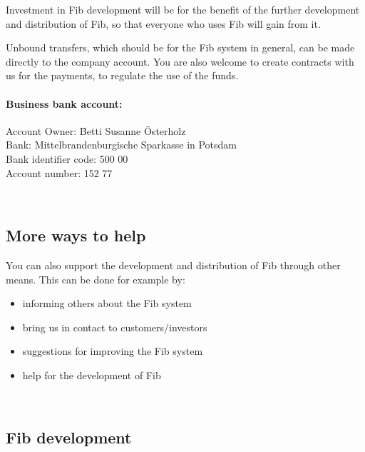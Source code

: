 \documentclass[12pt,a4paper]{article}
\begin{document}
Investment in Fib development will be for the benefit of the further development and distribution of Fib, so that everyone who uses Fib will gain from it.

Unbound transfers, which should be for the Fib system in general, can be made directly to the company account.
You are also welcome to create contracts with us for the payments, to regulate the use of the funds.


\paragraph{Business bank account:}

\begin{tabbing}
Account Owner: \hspace{1cm}\= Betti Susanne \"{O}sterholz\\
Bank:\> Mittelbrandenburgische Sparkasse in Potsdam\\
Bank identifier code:  500 00\\
Account number:  152 77\\
\end{tabbing}
\ \vspace{-1.0cm}


\subsection{More ways to help}

You can also support the development and distribution of Fib through other means.
This can be done for example by:
\begin{itemize}
 \item informing others about the Fib system
 \item bring us in contact to customers/investors
 \item suggestions for improving the Fib system
 \item help for the development of Fib
\end{itemize}
\ \vspace{-0.60cm}

\subsection{Fib development}
\end{document}
